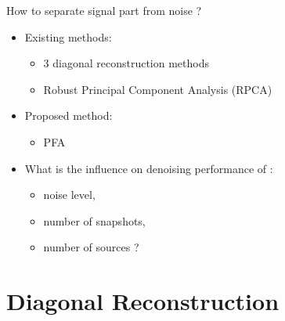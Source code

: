 \documentclass[8pt,xcolor=x11names,compress, notes=show]{beamer}%
\begin{document}
\begin{frame}{How to separate signal part from noise ?}
	 
	
	\begin{itemize}
		\item Existing methods:
			\begin{itemize}
			        \item 	3 diagonal reconstruction methods
		        		\item Robust Principal Component Analysis (RPCA)
			\end{itemize}
			
		\vfill\pause
	
		\item Proposed method:
			\begin{itemize}
       			 	\item PFA
			\end{itemize}

		\vfill \pause
		\item What is the influence on denoising performance of : 
		\begin{itemize}
		        \item noise level,
		        \item number of snapshots,
		        \item number of sources ?
		\end{itemize}
	\end{itemize}
\end{frame}


\section{Diagonal Reconstruction}
\begin{frame}
\tableofcontents[hideallsubsections]
\end{frame}
\begin{frame}
\end{frame}
\end{document}
